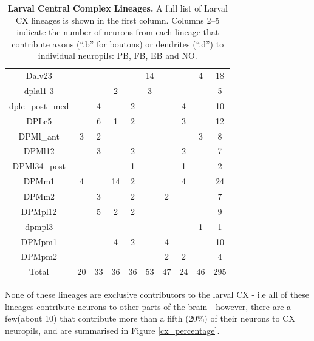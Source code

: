 \begin{table} [H]
{\begin{tabular}{|c|c|c|c|c|c|c|c|c|c|}
        Dalv23 &  &  &  &  & 14 &  &  & 4 & 18 \\
        dplal1-3 &  &  & 2 &  & 3 &  &  &  & 5 \\
        dplc\_post\_med &  & 4 &  & 2 &  &  & 4 &  & 10 \\
        DPLc5 &  & 6 & 1 & 2 &  &  & 3 &  & 12 \\
        DPMl\_ant & 3 & 2 &  &  &  &  &  & 3 & 8 \\
        DPMl12 &  & 3 &  & 2 &  &  & 2 &  & 7 \\
        DPMl34\_post &  &  &  & 1 &  &  & 1 &  & 2 \\
        DPMm1 & 4 &  & 14 & 2 &  &  & 4 &  & 24 \\
        DPMm2 &  & 3 &  & 2 &  & 2 &  &  & 7 \\
        DPMpl12 &  & 5 & 2 & 2 &  &  &  &  & 9 \\
        dpmpl3 &  &  &  &  &  &  &  & 1 & 1 \\
        DPMpm1 &  &  & 4 & 2 &  & 4 &  &  & 10 \\
        DPMpm2 &  &  &  &  &  & 2 & 2 &  & 4 \\
        \bottomrule
        Total & 20 & 33 & 36 & 36 & 53 & 47 & 24 & 46 & 295 \\
        \bottomrule
        \end{tabular}
        }
        \caption[Larval Central Complex Lineages]{\textbf{Larval Central Complex Lineages.} A full list of Larval CX lineages is shown in the first column.  Columns 2--5 indicate the number of neurons from each lineage that contribute axons (“.b” for boutons) or dendrites (“.d”) to individual neuropils: PB, FB, EB and NO.}
        \label{larvallineages}
        \end{table}

    None of these lineages are exclusive contributors to the larval CX - i.e all of these lineages contribute neurons to other parts of the brain - however, there are a few(about 10) that contribute more than a fifth (20\%) of their neurons to CX neuropils, and are summarised in Figure \ref{cx_percentage}.

